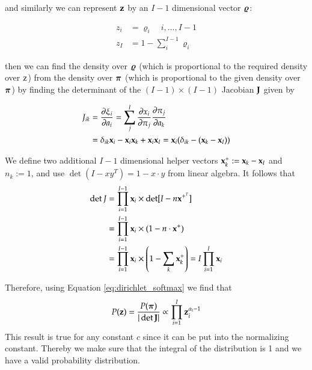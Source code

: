 and similarly we can represent $\mathbf{z}$ by an $I-1$ dimensional vector ${\boldsymbol{\varrho}}$:

\begin{align}
    z_i &= \varrho_i \quad i,...,I-1 \\
    z_I &= 1 - \sum_i^{I-1}\varrho_i
\end{align}

then we can find the density over ${\boldsymbol{\varrho}}$ (which is proportional to the required density over ${\textnormal{z}}$)
from the density over $\boldsymbol{\pi}$ (which is proportional to the given density over $\boldsymbol{\pi}$) by finding the
determinant of the $(I - 1) \times (I - 1)$ Jacobian ${\mathbf{J}}$ given by

\begin{align}
    J_{ik} &= \frac{\partial \xi_i}{\partial a_i} = \sum_j^{I} \frac{\partial x_i}{\partial \pi_j}\frac{\partial \pi_j}{\partial a_k} \nonumber\\
    &= \delta_{ik}{\mathbf{x}}_i - {\mathbf{x}}_i{\mathbf{x}}_k + {\mathbf{x}}_i{\mathbf{x}}_I =  {\mathbf{x}}_i(\delta_{ik} - ({\mathbf{x}}_k - {\mathbf{x}}_I))
\end{align}

We define two additional $I-1$ dimensional helper vectors ${\mathbf{x}}_k^+ := {\mathbf{x}}_k - {\mathbf{x}}_I$ and $n_k := 1$, and use $\det(I - xy^T) = 1 - x \cdot y$ from linear algebra. It follows that
\begin{align}
    \det J &= \prod_{i=1}^{I-1} {\mathbf{x}}_i \times \det[I-n{\mathbf{x}}^{+^T}] \nonumber \\
    &= \prod_{i=1}^{I-1} {\mathbf{x}}_i \times (1 - n \cdot {\mathbf{x}}^{+})  \\
    &= \prod_{i=1}^{I-1} {\mathbf{x}}_i \times \left(1 - \sum_k {\mathbf{x}}_k^{+} \right) = I \prod_{i=1}^I {\mathbf{x}}_i \nonumber
\end{align}

Therefore, using Equation \ref{eq:dirichlet_softmax} we find that
\begin{equation}
    P(\mathbf{z}) = \frac{P(\boldsymbol{\pi})}{|\det {\mathbf{J}}|} \propto \prod_{i=1}^{I} \mathbf{z}_i^{\alpha_i - 1} 
\end{equation}
This result is true for any constant $c$ since it can be put into the normalizing constant. Thereby we make sure that the integral of the distribution is 1 and we have a valid probability distribution.